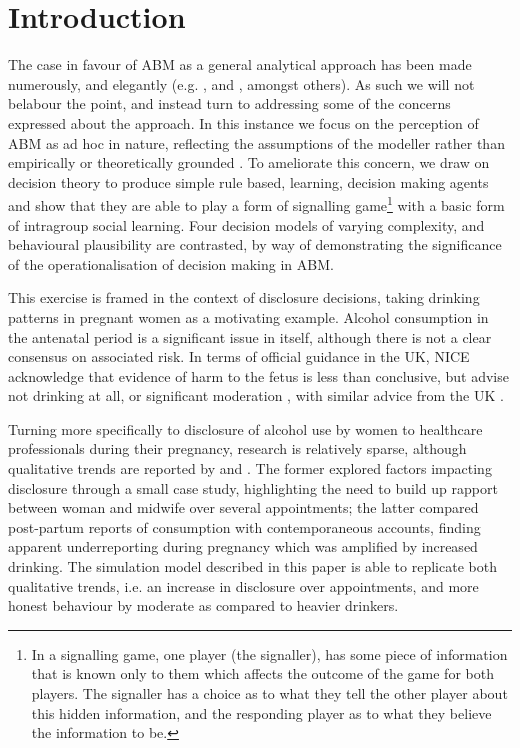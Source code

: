 \section{Introduction}
\label{sec:intro}

The case in favour of \ac{ABM} as a general analytical approach has been made numerously, and elegantly (e.g. \cite{epstein1994growing,Resnick,Axelrod1997,gilbert1999simulation,Macy2002a,Silverman2011,Silverman2013}, and \cite{epstein2014agent_zero}, amongst others). As such we will not belabour the point, and instead turn to addressing some of the concerns expressed about the approach. In this instance we focus on the perception of \ac{ABM} as ad hoc in nature, reflecting the assumptions of the modeller rather than empirically or theoretically grounded \citep{Waldherr2013}. To ameliorate this concern, we draw on decision theory to produce simple rule based, learning, decision making agents and show that they are able to play a form of signalling game\footnote{In a signalling game, one player (the signaller), has some piece of information that is known only to them which affects the outcome of the game for both players. The signaller has a choice as to what they tell the other player about this hidden information, and the responding player as to what they believe the information to be.} \citep{Kreps1987} with a basic form of intragroup social learning. Four decision models of varying complexity, and behavioural plausibility are contrasted, by way of demonstrating the significance of the operationalisation of decision making in \ac{ABM}.

This exercise is framed in the context of disclosure decisions, taking drinking patterns in pregnant women as a motivating example. Alcohol consumption in the antenatal period is a significant issue in itself, although there is not a clear consensus on associated risk. In terms of official guidance in the UK, \ac{NICE} acknowledge that evidence of harm to the fetus is less than conclusive, but advise not drinking at all, or significant moderation \citep{NICE2010a}, with similar advice from the UK \cite{DepartmentofHealth2008}.

Turning more specifically to disclosure of alcohol use by women to healthcare professionals during their pregnancy, research is relatively sparse, although qualitative trends are reported by \citet{Phillips2007} and \citet{Alvik2006}. The former explored factors impacting disclosure through a small case study, highlighting the need to build up rapport between woman and midwife over several appointments; the latter compared post-partum reports of consumption with contemporaneous accounts, finding apparent underreporting during pregnancy which was amplified by increased drinking. The simulation model described in this paper is able to replicate both qualitative trends, i.e. an increase in disclosure over appointments, and more honest behaviour by moderate as compared to heavier drinkers.

